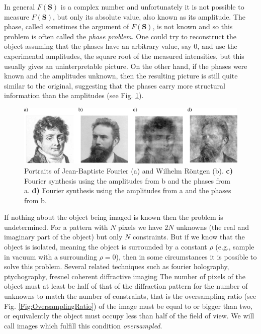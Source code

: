 In general $F(\mathbf S)$ is a complex number and unfortunately it is not
possible to measure $F(\mathbf S)$, but only its absolute value, also known as its
amplitude. The phase, called sometimes the argument of $F(\mathbf S)$, is not known and so
this problem is often called the {\em phase problem}. One could try to reconstruct the
object assuming that the phases have an arbitrary value, say 0, and use the
experimental amplitudes, the square root of the measured intensities, but this usually gives an uninterpretable picture. On
the other hand, if the phases were known and the amplitudes unknown, then the
resulting picture is still quite similar to the original, suggesting that the
phases carry more structural information than the amplitudes (see Fig. \ref{Fig:PhaseSwapping}).
\begin{figure}[h]
  \centering
  \includegraphics[width=1 \columnwidth]{Image_Reconstruction/PhaseSwapping2.png}
  \caption{Portraits of Jean-Baptiste Fourier (a) and Wilhelm R\"{o}ntgen (b).
    {\bf c)} Fourier synthesis using the amplitudes from b and the phases from
    a. {\bf d)}
    Fourier synthesis using the amplitudes from a and the phases from b.}
  \label{Fig:PhaseSwapping}
\end{figure}

If nothing about the object being imaged is known then the problem is
undetermined. For a pattern with $N$ pixels we have $2N$ unknowns (the real and
imaginary part of the object) but only $N$ constraints. But if we know that the object is isolated, meaning the
object is surrounded by a constant $\rho$ (e.g., sample in vacuum with a
surrounding $\rho = 0$), then in some circumstances it is possible to solve this
problem. Several related techniques such as fourier holography, ptychography, fresnel coherent diffractive imaging  The number of pixels of the object must at least be half of that of the
diffraction pattern for the number of unknowns to match the number of
constraints, that is the oversampling ratio (see
Fig. \ref{Fig:OversamplingRatio}) of the image must be equal to or bigger than
two, or equivalently the object must occupy less than half of the field of
view. We will call images which fulfill this condition {\em oversampled}.

